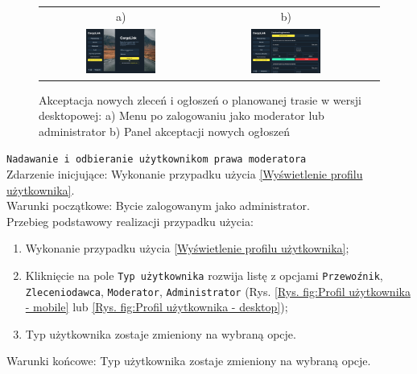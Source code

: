  \begin{figure}[H]
  \centering
   \begin{tabular}{@{}ccc@{}}
   a) & b)\\
   \includegraphics[width=0.45\textwidth]{rozdzial1/menu_moderator_d.jpg} &
   \includegraphics[width=0.45\textwidth]{rozdzial1/zatwierdz_d.jpg}
   \end{tabular}
  \caption{Akceptacja nowych zleceń i ogłoszeń o planowanej trasie w wersji desktopowej: a) Menu po zalogowaniu jako moderator lub administrator b) Panel akceptacji nowych ogłoszeń}
  \label{Akceptacja ogłoszenia - destkop - ab}
 \end{figure}

 \texttt{Nadawanie i odbieranie użytkownikom prawa moderatora} \\
 Zdarzenie inicjujące: Wykonanie przypadku użycia \ref{Wyświetlenie profilu użytkownika}. \\
 Warunki początkowe: Bycie zalogowanym jako administrator. \\
 Przebieg podstawowy realizacji przypadku użycia: \\
 \begin{enumerate}
    \item Wykonanie przypadku użycia \ref{Wyświetlenie profilu użytkownika};
    \item Kliknięcie na pole \texttt{Typ użytkownika} rozwija listę z opcjami \texttt{Przewoźnik}, \texttt{Zleceniodawca}, \texttt{Moderator}, \texttt{Administrator} (Rys. \ref{Rys. fig:Profil użytkownika - mobile} lub \ref{Rys. fig:Profil użytkownika - desktop});
    \item Typ użytkownika zostaje zmieniony na wybraną opcje.
 \end{enumerate}
 Warunki końcowe: Typ użytkownika zostaje zmieniony na wybraną opcje. \\

